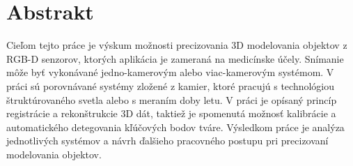 
\chapter*{Abstrakt} \label{kap:Abstrakt}

Cieľom tejto práce je výskum možnosti precizovania 3D modelovania objektov z RGB-D
senzorov, ktorých aplikácia je zameraná na medicínske účely. Snímanie môže byť vykonávané
jedno-kamerovým alebo viac-kamerovým systémom. V práci sú porovnávané systémy zložené
z kamier, ktoré pracujú s technológiou štruktúrovaného svetla alebo s meraním doby letu. V práci
je opísaný princíp registrácie a rekonštrukcie 3D dát, taktiež je spomenutá možnosť kalibrácie a
automatického detegovania kľúčových bodov tváre. Výsledkom práce je analýza jednotlivých
systémov a návrh ďalšieho pracovného postupu pri precizovaní modelovania objektov.